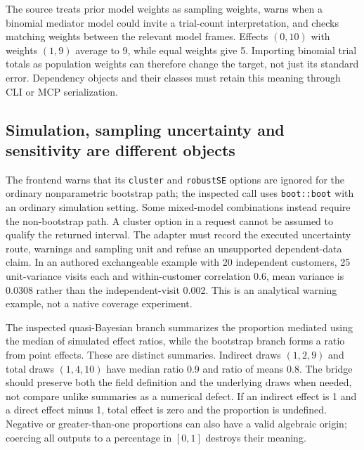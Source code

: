 The source treats prior model weights as sampling weights, warns when a
binomial mediator model could invite a trial-count interpretation, and checks
matching weights between the relevant model frames. Effects $(0,10)$ with
weights $(1,9)$ average to 9, while equal weights give 5. Importing binomial
trial totals as population weights can therefore change the target, not just
its standard error. Dependency objects and their classes must retain this
meaning through CLI or MCP serialization.
\citep{exec24_mediation_sources,exec24_mediation_contract}

\subsection{Simulation, sampling uncertainty and sensitivity are different objects}
The frontend warns that its \texttt{cluster} and \texttt{robustSE} options are
ignored for the ordinary nonparametric bootstrap path; the inspected call uses
\texttt{boot::boot} with an ordinary simulation setting. Some mixed-model
combinations instead require the non-bootstrap path. A cluster option in a
request cannot be assumed to qualify the returned interval. The adapter must
record the executed uncertainty route, warnings and sampling unit and refuse
an unsupported dependent-data claim. In an authored exchangeable example with
20 independent customers, 25 unit-variance visits each and within-customer
correlation 0.6, mean variance is 0.0308 rather than the independent-visit
0.002. This is an analytical warning example, not a native coverage experiment.
\citep{exec24_mediation_sources,exec24_mediation_contract}

The inspected quasi-Bayesian branch summarizes the proportion mediated using
the median of simulated effect ratios, while the bootstrap branch forms a
ratio from point effects. These are distinct summaries. Indirect draws
$(1,2,9)$ and total draws $(1,4,10)$ have median ratio 0.9 and ratio of means
0.8. The bridge should preserve both the field definition and the underlying
draws when needed, not compare unlike summaries as a numerical defect. If an
indirect effect is 1 and a direct effect minus 1, total effect is zero and the
proportion is undefined. Negative or greater-than-one proportions can also
have a valid algebraic origin; coercing all outputs to a percentage in
$[0,1]$ destroys their meaning.
\citep{exec24_mediation_sources,exec24_mediation_contract,exec20_med_reference}

